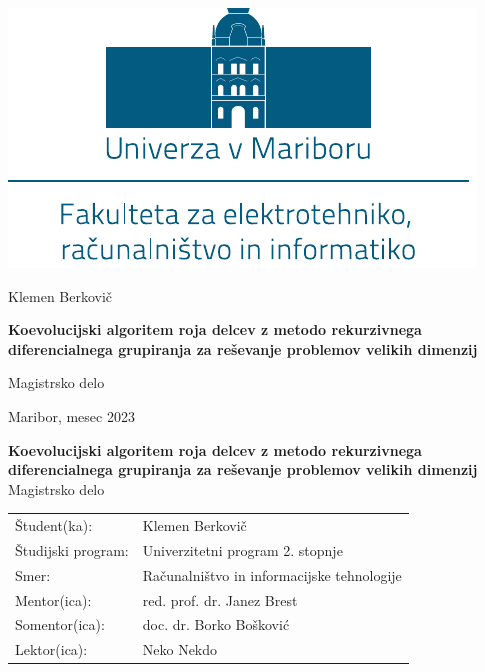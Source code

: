 \documentclass[openany, a4paper, 12pt]{book}
\newcounter{footnotemarknum}
\newcommand{\footnotemarkenv}{\addtocounter{footnotemarknum}{1}\footnotemark}
\newcommand{\aauthor}{Klemen Berkovi\v{c}}
\newcommand{\atitleslo}{Koevolucijski algoritem roja delcev z metodo rekurzivnega diferencialnega grupiranja za reševanje problemov velikih dimenzij}
\newcommand{\atype}{Magistrsko delo}
\newcommand{\adate}{Maribor, mesec 2023}
\newcommand{\amentor}{red. prof. dr. Janez Brest}
\newcommand{\asomentor}{doc. dr. Borko Bošković}
\newcommand{\alektor}{Neko Nekdo}
\begin{document}
\newpage
\begin{center}
\includegraphics[scale=0.9]{img/logo-um-feri.pdf} %
\vspace{3cm}

{\LARGE \aauthor\\} %
\vspace{10mm}

{\bf \huge \MakeUppercase \atitleslo}\\ %
\vspace{10mm}

{\LARGE \atype}\\ %
\vspace{8.5cm}

{\LARGE \adate}\\ %
\end{center}

\newpage
\pagestyle{frontpage}

\vspace*{2.5cm}
\begin{center}
{\bf \LARGE \MakeUppercase \atitleslo}\\ %
\vspace{5mm}
{\Large \atype}\\ %
\end{center}
\vspace{3cm}
\begin{table}[h]
    \renewcommand{\arraystretch}{1.5}
    \begin{tabular}{ll}
     Študent(ka): & \aauthor \\
     Študijski program: & Univerzitetni program 2. stopnje \\
     Smer: & Računalništvo in informacijske tehnologije \\
     Mentor(ica): & \amentor \\
     Somentor(ica): & \asomentor \\
     Lektor(ica): & \alektor \\
    \end{tabular}
\end{table}
\end{document}
